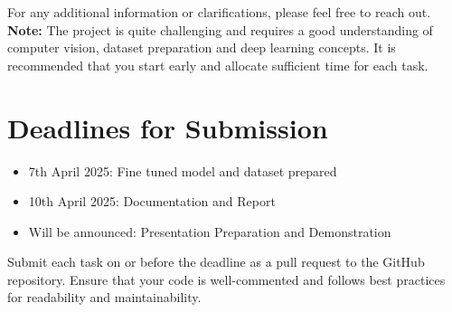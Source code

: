 \documentclass{article}
\begin{document}
For any additional information or clarifications, please feel free to reach out.\\

\textbf{Note:} The project is quite challenging and requires a good understanding of computer vision, dataset preparation and deep learning concepts. It is recommended that you start early and allocate sufficient time for each task.

\section*{Deadlines for Submission}
\begin{itemize}
    \item 7th April 2025: Fine tuned model and dataset prepared
    \item 10th April 2025: Documentation and Report
    \item Will be announced: Presentation Preparation and Demonstration
\end{itemize}

Submit each task on or before the deadline as a pull request to the GitHub repository. Ensure that your code is well-commented and follows best practices for readability and maintainability.
\end{document}
